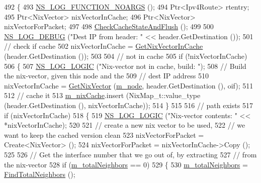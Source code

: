 \begin{DoxyCode}
492 \{
493   \hyperlink{log-macros-disabled_8h_a8f7e4afc291c9d29a65c18ac1f79197b}{NS\_LOG\_FUNCTION\_NOARGS} ();
494   Ptr<Ipv4Route> rtentry;
495   Ptr<NixVector> nixVectorInCache;
496   Ptr<NixVector> nixVectorForPacket;
497 
498   \hyperlink{classns3_1_1Ipv4NixVectorRouting_aeeafd72dfb17da8349627232c9e9984f}{CheckCacheStateAndFlush} ();
499 
500   \hyperlink{group__logging_ga413f1886406d49f59a6a0a89b77b4d0a}{NS\_LOG\_DEBUG} (\textcolor{stringliteral}{"Dest IP from header: "} << header.GetDestination ());
501   \textcolor{comment}{// check if cache}
502   nixVectorInCache = \hyperlink{classns3_1_1Ipv4NixVectorRouting_afeecd07d75e1fda9a99d1f914ec331ce}{GetNixVectorInCache} (header.GetDestination ());
503 
504   \textcolor{comment}{// not in cache}
505   \textcolor{keywordflow}{if} (!nixVectorInCache)
506     \{
507       \hyperlink{group__logging_ga88acd260151caf2db9c0fc84997f45ce}{NS\_LOG\_LOGIC} (\textcolor{stringliteral}{"Nix-vector not in cache, build: "});
508       \textcolor{comment}{// Build the nix-vector, given this node and the}
509       \textcolor{comment}{// dest IP address}
510       nixVectorInCache = \hyperlink{classns3_1_1Ipv4NixVectorRouting_ad1f618c1b1264f0d01644b9a68a0bd20}{GetNixVector} (\hyperlink{classns3_1_1Ipv4NixVectorRouting_a329265b09f4d85bac6ec9bd0ec2daa92}{m\_node}, header.GetDestination (), oif);
511 
512       \textcolor{comment}{// cache it}
513       \hyperlink{classns3_1_1Ipv4NixVectorRouting_a394e830e592aa6ef064be362150219f2}{m\_nixCache}.insert (NixMap\_t::value\_type (header.GetDestination (), nixVectorInCache));
514     \}
515 
516   \textcolor{comment}{// path exists}
517   \textcolor{keywordflow}{if} (nixVectorInCache)
518     \{
519       \hyperlink{group__logging_ga88acd260151caf2db9c0fc84997f45ce}{NS\_LOG\_LOGIC} (\textcolor{stringliteral}{"Nix-vector contents: "} << *nixVectorInCache);
520 
521       \textcolor{comment}{// create a new nix vector to be used, }
522       \textcolor{comment}{// we want to keep the cached version clean}
523       nixVectorForPacket = Create<NixVector> ();
524       nixVectorForPacket = nixVectorInCache->Copy (); 
525 
526       \textcolor{comment}{// Get the interface number that we go out of, by extracting}
527       \textcolor{comment}{// from the nix-vector}
528       \textcolor{keywordflow}{if} (\hyperlink{classns3_1_1Ipv4NixVectorRouting_a96620dedcc6c052265c3c53aa14e4f6b}{m\_totalNeighbors} == 0)
529         \{
530           \hyperlink{classns3_1_1Ipv4NixVectorRouting_a96620dedcc6c052265c3c53aa14e4f6b}{m\_totalNeighbors} = \hyperlink{classns3_1_1Ipv4NixVectorRouting_ae4d125bd51c2d70084543489f00060b5}{FindTotalNeighbors} ();

\end{DoxyCode}
